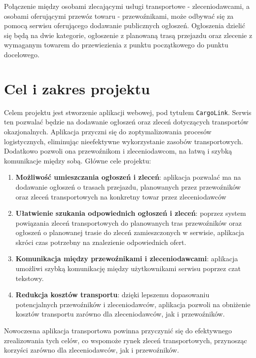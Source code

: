 Połączenie między osobami zlecającymi usługi transportowe - zleceniodawcami, a osobami oferującymi przewóz towaru - przewoźnikami, może odbywać się za pomocą serwisu oferującego dodawanie publicznych ogłoszeń. Ogłoszenia dzielić się będą na dwie kategorie, ogłoszenie z planowaną trasą przejazdu oraz zlecenie z wymaganym towarem do przewiezienia z punktu początkowego do punktu docelowego.

\section{Cel i zakres projektu}
\label{sec:cele}
Celem projektu jest stworzenie aplikacji webowej, pod tytułem \texttt{CargoLink}. Serwis ten pozwalać będzie na dodawanie ogłoszeń oraz zleceń dotyczących transportów okazjonalnych. Aplikacja przyczni się do zoptymalizowania procesów logistycznych, eliminując nieefektywne wykorzystanie zasobów transportowych. Dodatkowo pozwoli ona przewoźnikom i zleceniodawcom, na łatwą i szybką komunikacje między sobą.
Główne cele projektu:
\begin{enumerate}
    \item \textbf{Możliwość umieszczania ogłoszeń i zleceń}: aplikacja pozwalać ma na dodawanie ogłoszeń o trasach przejazdu, planowanych przez przewoźników oraz zleceń transportowych na konkretny towar przez zleceniodawców
    \item \textbf{Ułatwienie szukania odpowiednich ogłoszeń i zleceń}: poprzez system powiązania zleceń transportowych do planowanych tras przewoźników oraz ogłoszeń o planowanej trasie do zleceń zamieszczonych w serwisie, aplikacja skróci czas potrzebny na znalezienie odpowiednich ofert.
    \item \textbf{Komunikacja między przewoźnikami i zleceniodawcami}: aplikacja umożliwi szybką komunikację między użytkownikami serwisu poprzez czat tekstowy.
    \item \textbf{Redukcja kosztów transportu}: dzięki lepszemu dopasowaniu potencjalnych przewoźników i zleceniodawców, aplikacja pozwoli na obniżenie kosztów transportu zarówno dla zleceniodawców, jak i przewoźników.
\end{enumerate}
Nowoczesna aplikacja transportowa powinna przyczynić się do efektywnego zrealizowania tych celów, co wspomoże rynek zleceń transportowych, przynosząc korzyści zarówno dla zleceniodawców, jak i przewoźników.


